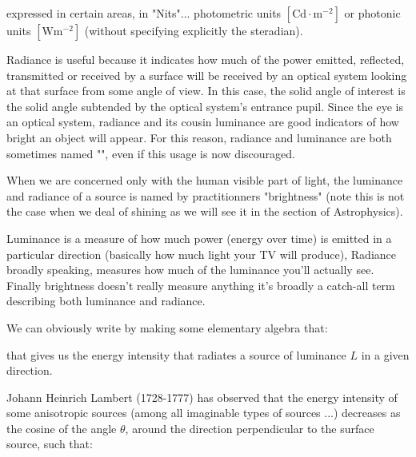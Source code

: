 	expressed in certain areas, in "Nits"... photometric units  $[\text{Cd}\cdot\text{m}^{-2}]$ or photonic units $[\text{W}\text{m}^{-2}]$ (without specifying explicitly the steradian).
	
	Radiance is useful because it indicates how much of the power emitted, reflected, transmitted or received by a surface will be received by an optical system looking at that surface from some angle of view. In this case, the solid angle of interest is the solid angle subtended by the optical system's entrance pupil. Since the eye is an optical system, radiance and its cousin luminance are good indicators of how bright an object will appear. For this reason, radiance and luminance are both sometimes named "", even if this usage is now discouraged.
	\begin{tcolorbox}[title=Remark,colframe=black,arc=10pt]
	When we are concerned only with the human visible part of light, the luminance and radiance of a source is named by practitionners "brightness" (note this is not the case when we deal of shining as we will see it in the section of Astrophysics).
	\end{tcolorbox}	
	Luminance is a measure of how much power (energy over time) is emitted in a particular direction (basically how much light your TV will produce), Radiance broadly speaking, measures how much of the luminance you'll actually see. Finally brightness doesn't really measure anything it's broadly a catch-all term describing both luminance and radiance.
	
	We can obviously write by making some elementary algebra that:
	
	that gives us the energy intensity that radiates a source of luminance $L$ in a given direction.

	Johann Heinrich Lambert (1728-1777) has observed that the energy intensity of some anisotropic sources (among all imaginable types of sources ...) decreases as the cosine of the angle $\theta$, around the direction perpendicular to the surface source, such that:
 	
